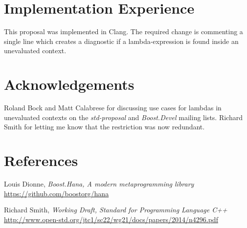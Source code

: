 \documentclass[11pt]{article}
\begin{document}
\section{Implementation Experience}
This proposal was implemented in Clang. The required change is commenting a single line
which creates a diagnostic if a lambda-expression is found inside an unevaluated context.


\section{Acknowledgements}
Roland Bock and Matt Calabrese for discussing use cases for lambdas in unevaluated contexts
on the \textit{std-proposal} and \textit{Boost.Devel} mailing lists. Richard Smith for letting
me know that the restriction was now redundant.


\section{References}
\renewcommand{\section}[2]{}%
\begin{thebibliography}{9}

    Louis Dionne,
    \emph{Boost.Hana, A modern metaprogramming library}\newline
    \url{https://github.com/boostorg/hana}

    Richard Smith,
    \emph{Working Draft, Standard for Programming Language C++}\newline
    \url{http://www.open-std.org/jtc1/sc22/wg21/docs/papers/2014/n4296.pdf}

\end{thebibliography}
\end{document}
